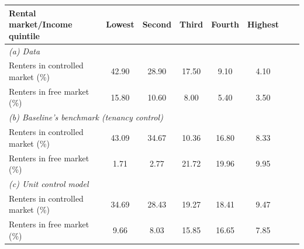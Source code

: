 \begin{table}[p]
\footnotesize
\renewcommand{\arraystretch}{1.2}
\begin{center}
\begin{tabular}{lccccccc}
\toprule
Rental market/Income quintile & Lowest & Second & Third & Fourth & Highest\\ 
\midrule
\multicolumn{6}{l}{\textit{(a) Data}}\\
Renters in controlled market (\%) & 42.90 & 28.90 & 17.50 &	9.10 & 4.10\\
Renters in free market (\%) & 15.80 & 10.60 & 8.00 & 5.40 & 3.50 \\
\multicolumn{6}{l}{\textit{(b) Baseline's benchmark (tenancy control)}}\\
Renters in controlled market (\%) & 43.09 & 34.67 & 10.36 & 16.80 & 8.33 \\
Renters in free market (\%) & 1.71 & 2.77 & 21.72 & 19.96 & 9.95 \\
\multicolumn{6}{l}{\textit{(c) Unit control model}}\\
Renters in controlled market (\%) & 34.69 & 28.43 & 19.27 & 18.41 & 9.47 \\
Renters in free market (\%) & 9.66 & 8.03 & 15.85 & 16.65 & 7.85\\
\bottomrule
\end{tabular}
\end{center}
\normalsize
\end{table}

